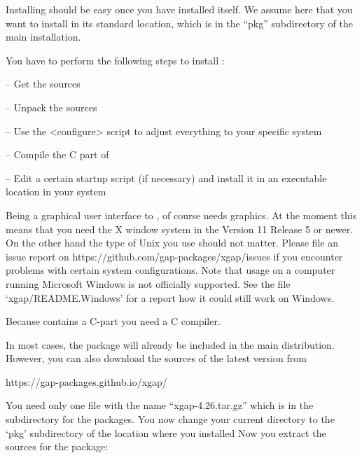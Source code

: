 
Installing {\XGAP} should be easy once you have installed {\GAP} itself. We
assume here that you want to install {\XGAP} in its standard location,
which is in the ``pkg'' subdirectory of the main {} installation.


You have to perform the following steps to install {\XGAP}:

\beginlist
\item{--} Get the sources
\item{--} Unpack the sources
\item{--} Use the <configure> script to adjust everything to your specific
  system
\item{--} Compile the C part of {\XGAP}
\item{--} Edit a certain startup script (if necessary) and install it in 
      an executable location in your system
\endlist


Being a graphical user interface to {\GAP}, {\XGAP} of course needs
graphics. At the moment this means that you need the X window system in the 
Version 11 Release 5 or newer. On the other hand the type of Unix you use 
should not matter. Please file an issue report on
\begintt
https://github.com/gap-packages/xgap/issues
\endtt
if you encounter problems with certain system configurations.
Note that usage on 
a computer running Microsoft Windows is not officially supported. 
See the file `xgap/README.Windows' for a report how it could
still work on Windows. 

Because {\XGAP} contains a C-part you need a C compiler.


In most cases, the {\XGAP} package will already be included in the main
distribution. However, you can also download the sources of the latest
version from

\begintt
https://gap-packages.github.io/xgap/
\endtt

You need only one file with the name ``xgap-4.26.tar.gz''
which is in the subdirectory for the packages.
You now change your current directory to the `pkg' subdirectory of the 
location where you installed
{\GAP}
Now you extract the sources for the {\XGAP} package:

